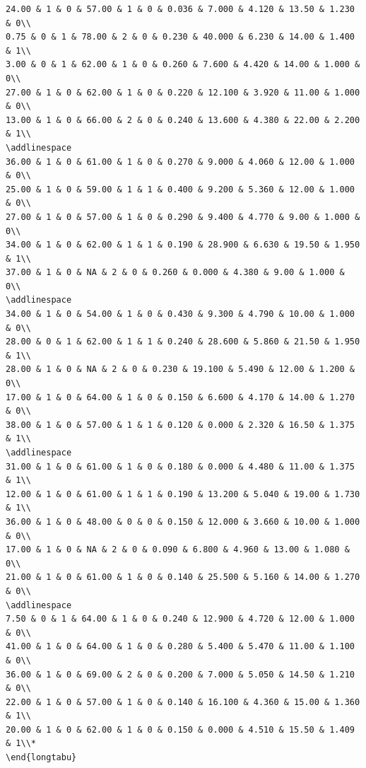 \documentclass[
]{article}
\begin{document}
\begin{verbatim}
24.00 & 1 & 0 & 57.00 & 1 & 0 & 0.036 & 7.000 & 4.120 & 13.50 & 1.230 & 0\\
0.75 & 0 & 1 & 78.00 & 2 & 0 & 0.230 & 40.000 & 6.230 & 14.00 & 1.400 & 1\\
3.00 & 0 & 1 & 62.00 & 1 & 0 & 0.260 & 7.600 & 4.420 & 14.00 & 1.000 & 0\\
27.00 & 1 & 0 & 62.00 & 1 & 0 & 0.220 & 12.100 & 3.920 & 11.00 & 1.000 & 0\\
13.00 & 1 & 0 & 66.00 & 2 & 0 & 0.240 & 13.600 & 4.380 & 22.00 & 2.200 & 1\\
\addlinespace
36.00 & 1 & 0 & 61.00 & 1 & 0 & 0.270 & 9.000 & 4.060 & 12.00 & 1.000 & 0\\
25.00 & 1 & 0 & 59.00 & 1 & 1 & 0.400 & 9.200 & 5.360 & 12.00 & 1.000 & 0\\
27.00 & 1 & 0 & 57.00 & 1 & 0 & 0.290 & 9.400 & 4.770 & 9.00 & 1.000 & 0\\
34.00 & 1 & 0 & 62.00 & 1 & 1 & 0.190 & 28.900 & 6.630 & 19.50 & 1.950 & 1\\
37.00 & 1 & 0 & NA & 2 & 0 & 0.260 & 0.000 & 4.380 & 9.00 & 1.000 & 0\\
\addlinespace
34.00 & 1 & 0 & 54.00 & 1 & 0 & 0.430 & 9.300 & 4.790 & 10.00 & 1.000 & 0\\
28.00 & 0 & 1 & 62.00 & 1 & 1 & 0.240 & 28.600 & 5.860 & 21.50 & 1.950 & 1\\
28.00 & 1 & 0 & NA & 2 & 0 & 0.230 & 19.100 & 5.490 & 12.00 & 1.200 & 0\\
17.00 & 1 & 0 & 64.00 & 1 & 0 & 0.150 & 6.600 & 4.170 & 14.00 & 1.270 & 0\\
38.00 & 1 & 0 & 57.00 & 1 & 1 & 0.120 & 0.000 & 2.320 & 16.50 & 1.375 & 1\\
\addlinespace
31.00 & 1 & 0 & 61.00 & 1 & 0 & 0.180 & 0.000 & 4.480 & 11.00 & 1.375 & 1\\
12.00 & 1 & 0 & 61.00 & 1 & 1 & 0.190 & 13.200 & 5.040 & 19.00 & 1.730 & 1\\
36.00 & 1 & 0 & 48.00 & 0 & 0 & 0.150 & 12.000 & 3.660 & 10.00 & 1.000 & 0\\
17.00 & 1 & 0 & NA & 2 & 0 & 0.090 & 6.800 & 4.960 & 13.00 & 1.080 & 0\\
21.00 & 1 & 0 & 61.00 & 1 & 0 & 0.140 & 25.500 & 5.160 & 14.00 & 1.270 & 0\\
\addlinespace
7.50 & 0 & 1 & 64.00 & 1 & 0 & 0.240 & 12.900 & 4.720 & 12.00 & 1.000 & 0\\
41.00 & 1 & 0 & 64.00 & 1 & 0 & 0.280 & 5.400 & 5.470 & 11.00 & 1.100 & 0\\
36.00 & 1 & 0 & 69.00 & 2 & 0 & 0.200 & 7.000 & 5.050 & 14.50 & 1.210 & 0\\
22.00 & 1 & 0 & 57.00 & 1 & 0 & 0.140 & 16.100 & 4.360 & 15.00 & 1.360 & 1\\
20.00 & 1 & 0 & 62.00 & 1 & 0 & 0.150 & 0.000 & 4.510 & 15.50 & 1.409 & 1\\*
\end{longtabu}


\end{verbatim}
\end{document}

